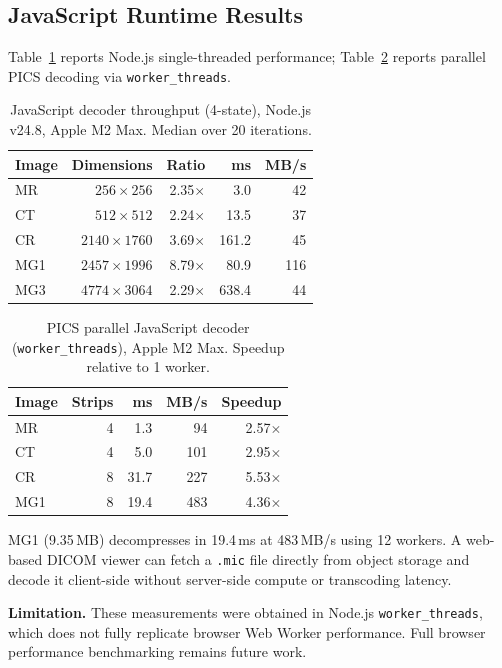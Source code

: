 \documentclass[journal]{IEEEtran}
\begin{document}
\subsection{JavaScript Runtime Results}

Table~\ref{tab:js-perf} reports Node.js single-threaded performance;
Table~\ref{tab:pics-js} reports parallel PICS decoding via
\texttt{worker\_threads}.

\begin{table}[htbp]
\centering
\caption{JavaScript decoder throughput (4-state), Node.js v24.8, Apple M2 Max.
Median over 20 iterations.}
\label{tab:js-perf}
\begin{tabular}{lrrrr}
\toprule
Image & Dimensions & Ratio & ms & MB/s \\
\midrule
MR  & $256{\times}256$ & 2.35$\times$ & 3.0 & 42 \\
CT  & $512{\times}512$ & 2.24$\times$ & 13.5 & 37 \\
CR  & $2140{\times}1760$ & 3.69$\times$ & 161.2 & 45 \\
MG1 & $2457{\times}1996$ & 8.79$\times$ & 80.9 & 116 \\
MG3 & $4774{\times}3064$ & 2.29$\times$ & 638.4 & 44 \\
\bottomrule
\end{tabular}
\end{table}

\begin{table}[htbp]
\centering
\caption{PICS parallel JavaScript decoder (\texttt{worker\_threads}), Apple M2
Max. Speedup relative to 1 worker.}
\label{tab:pics-js}
\begin{tabular}{lrrrr}
\toprule
Image & Strips & ms & MB/s & Speedup \\
\midrule
MR  & 4 & 1.3 & 94 & 2.57$\times$ \\
CT  & 4 & 5.0 & 101 & 2.95$\times$ \\
CR  & 8 & 31.7 & 227 & 5.53$\times$ \\
MG1 & 8 & 19.4 & 483 & 4.36$\times$ \\
\bottomrule
\end{tabular}
\end{table}

MG1 (9.35\,MB) decompresses in 19.4\,ms at 483\,MB/s using 12 workers.
A web-based DICOM viewer can fetch a \texttt{.mic} file directly from
object storage and decode it client-side without server-side compute or
transcoding latency.

\textbf{Limitation.} These measurements were obtained in Node.js
\texttt{worker\_threads}, which does not fully replicate browser Web Worker
performance. Full browser performance benchmarking remains future work.
\end{document}

